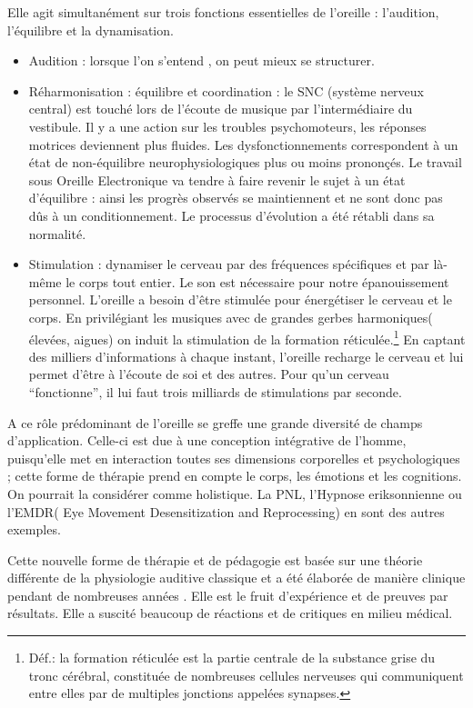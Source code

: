 Elle agit simultanément sur trois fonctions essentielles de l'oreille
: l'audition, l'équilibre et la dynamisation.
\begin{itemize}
\item Audition : lorsque l'on s'entend , on peut mieux se structurer.
\item Réharmonisation : équilibre et coordination : le SNC (système nerveux
central) est touché lors de l'écoute de musique par l'intermédiaire
du vestibule. Il y a une action sur les troubles psychomoteurs, les
réponses motrices deviennent plus fluides. Les dysfonctionnements
correspondent à un état de non-équilibre neurophysiologiques plus
ou moins prononçés. Le travail sous Oreille Electronique va tendre
à faire revenir le sujet à un état d'équilibre : ainsi les progrès
observés se maintiennent et ne sont donc pas dûs à un conditionnement.
Le processus d'évolution a été rétabli dans sa normalité.
\item Stimulation : dynamiser le cerveau par des fréquences spécifiques
et par là-même le corps tout entier. Le son est nécessaire pour notre
épanouissement personnel. L'oreille a besoin d'être stimulée pour
énergétiser le cerveau et le corps. En privilégiant les musiques avec
de grandes gerbes harmoniques( élevées, aigues) on induit la stimulation
de la formation réticulée.\footnote{Déf.: la formation réticulée est la partie centrale de la substance grise du tronc cérébral, constituée de nombreuses cellules nerveuses qui communiquent entre elles par de multiples jonctions appelées synapses.  } En captant des milliers d'informations
à chaque instant, l'oreille recharge le cerveau et lui permet d'être
à l'écoute de soi et des autres. Pour qu'un cerveau ``fonctionne'',
il lui faut trois milliards de stimulations par seconde.
\end{itemize}
A ce rôle prédominant de l'oreille se greffe une grande diversité
de champs d'application. Celle-ci est due à une conception intégrative
de l'homme, puisqu'elle met en interaction toutes ses dimensions corporelles
et psychologiques ; cette forme de thérapie prend en compte le corps,
les émotions et les cognitions. On pourrait la considérer comme holistique.
La PNL, l'Hypnose eriksonnienne ou l'EMDR( Eye Movement Desensitization
and Reprocessing) en sont des autres exemples. 

Cette nouvelle forme de thérapie et de pédagogie est basée sur une
théorie différente de la physiologie auditive classique et a été élaborée
de manière clinique pendant de nombreuses années . Elle est le fruit
d'expérience et de preuves par résultats. Elle a suscité beaucoup
de réactions et de critiques en milieu médical. 


